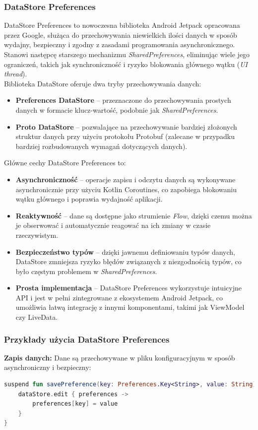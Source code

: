 \documentclass[12pt]{article}
\begin{document}
\subsubsection{DataStore Preferences}
DataStore Preferences to nowoczesna biblioteka Android Jetpack opracowana przez Google, służąca do przechowywania niewielkich ilości danych w sposób wydajny,
bezpieczny i zgodny z zasadami programowania asynchronicznego. Stanowi następcę starszego mechanizmu \textit{SharedPreferences}, eliminując wiele jego ograniczeń,
takich jak synchroniczność i ryzyko blokowania głównego wątku (\textit{UI thread}).\\
Biblioteka DataStore oferuje dwa tryby przechowywania danych:
\begin{itemize}
    \item \textbf{Preferences DataStore} – przeznaczone do przechowywania prostych danych w formacie klucz-wartość, podobnie jak \textit{SharedPreferences}.
    \item \textbf{Proto DataStore} – pozwalające na przechowywanie bardziej złożonych struktur danych przy użyciu protokołu Protobuf
          (zalecane w przypadku bardziej rozbudowanych wymagań dotyczących danych).
\end{itemize}
Główne cechy DataStore Preferences to:
\begin{itemize}
    \item \textbf{Asynchroniczność} – operacje zapisu i odczytu danych są wykonywane asynchronicznie przy użyciu Kotlin Coroutines,
          co zapobiega blokowaniu wątku głównego i poprawia wydajność aplikacji.
    \item \textbf{Reaktywność} – dane są dostępne jako strumienie \textit{Flow}, dzięki czemu można je obserwować i automatycznie reagować na ich zmiany
          w czasie rzeczywistym.
    \item \textbf{Bezpieczeństwo typów} – dzięki jawnemu definiowaniu typów danych, DataStore zmniejsza ryzyko błędów związanych z niezgodnością typów,
          co było częstym problemem w \textit{SharedPreferences}.
    \item \textbf{Prosta implementacja} – DataStore Preferences wykorzystuje intuicyjne API i jest w pełni zintegrowane z ekosystemem Android Jetpack, co umożliwia łatwą integrację z innymi komponentami, takimi jak ViewModel czy LiveData.
\end{itemize}

\subsubsection*{Przykłady użycia DataStore Preferences}
\noindent \textbf{Zapis danych:} Dane są przechowywane w pliku konfiguracyjnym w sposób asynchroniczny i bezpieczny:
\begin{lstlisting}[language=Kotlin]
suspend fun savePreference(key: Preferences.Key<String>, value: String) {
    dataStore.edit { preferences ->
        preferences[key] = value
    }
}
\end{lstlisting}
\end{document}
